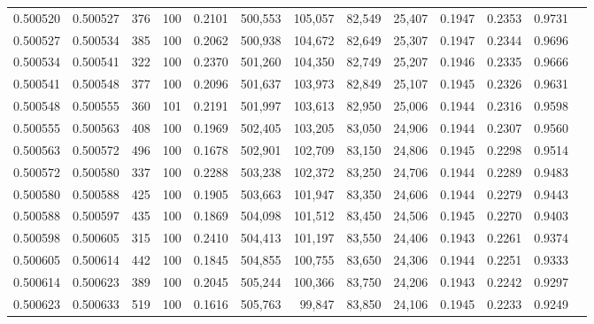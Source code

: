 \begin{tabular}{rrrrrrrrrrrrr}
0.500520 & 0.500527 &   376 & 100 &                                     0.2101 & 500,553 & 105,057 &  82,549 &  25,407 & 0.1947 & 0.2353 & 0.9731 \\
0.500527 & 0.500534 &   385 & 100 &                                     0.2062 & 500,938 & 104,672 &  82,649 &  25,307 & 0.1947 & 0.2344 & 0.9696 \\
0.500534 & 0.500541 &   322 & 100 &                                     0.2370 & 501,260 & 104,350 &  82,749 &  25,207 & 0.1946 & 0.2335 & 0.9666 \\
0.500541 & 0.500548 &   377 & 100 &                                     0.2096 & 501,637 & 103,973 &  82,849 &  25,107 & 0.1945 & 0.2326 & 0.9631 \\
0.500548 & 0.500555 &   360 & 101 &                                     0.2191 & 501,997 & 103,613 &  82,950 &  25,006 & 0.1944 & 0.2316 & 0.9598 \\
0.500555 & 0.500563 &   408 & 100 &                                     0.1969 & 502,405 & 103,205 &  83,050 &  24,906 & 0.1944 & 0.2307 & 0.9560 \\
0.500563 & 0.500572 &   496 & 100 &                                     0.1678 & 502,901 & 102,709 &  83,150 &  24,806 & 0.1945 & 0.2298 & 0.9514 \\
0.500572 & 0.500580 &   337 & 100 &                                     0.2288 & 503,238 & 102,372 &  83,250 &  24,706 & 0.1944 & 0.2289 & 0.9483 \\
0.500580 & 0.500588 &   425 & 100 &                                     0.1905 & 503,663 & 101,947 &  83,350 &  24,606 & 0.1944 & 0.2279 & 0.9443 \\
0.500588 & 0.500597 &   435 & 100 &                                     0.1869 & 504,098 & 101,512 &  83,450 &  24,506 & 0.1945 & 0.2270 & 0.9403 \\
0.500598 & 0.500605 &   315 & 100 &                                     0.2410 & 504,413 & 101,197 &  83,550 &  24,406 & 0.1943 & 0.2261 & 0.9374 \\
0.500605 & 0.500614 &   442 & 100 &                                     0.1845 & 504,855 & 100,755 &  83,650 &  24,306 & 0.1944 & 0.2251 & 0.9333 \\
0.500614 & 0.500623 &   389 & 100 &                                     0.2045 & 505,244 & 100,366 &  83,750 &  24,206 & 0.1943 & 0.2242 & 0.9297 \\
0.500623 & 0.500633 &   519 & 100 &                                     0.1616 & 505,763 &  99,847 &  83,850 &  24,106 & 0.1945 & 0.2233 & 0.9249 \\

\end{tabular}

